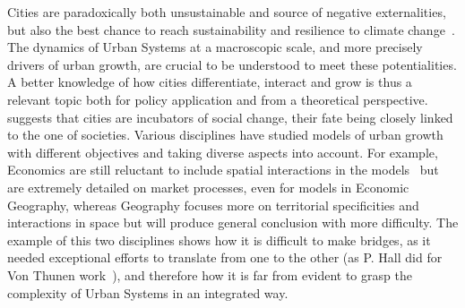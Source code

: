 Cities are paradoxically both unsustainable and source of negative externalities, but also the best chance to reach sustainability and resilience to climate change~\citep{glaeser2011triumph}. The dynamics of Urban Systems at a macroscopic scale, and more precisely drivers of urban growth, are crucial to be understood to meet these potentialities. A better knowledge of how cities differentiate, interact and grow is thus a relevant topic both for policy application and from a theoretical perspective. \cite{pumain2009innovation} suggests that cities are incubators of social change, their fate being closely linked to the one of societies. Various disciplines have studied models of urban growth with different objectives and taking diverse aspects into account. For example, Economics are still reluctant to include spatial interactions in the models~\citep{krugman1998space} but are extremely detailed on market processes, even for models in Economic Geography, whereas Geography focuses more on territorial specificities and interactions in space but will produce general conclusion with more difficulty. The example of this two disciplines shows how it is difficult to make bridges, as it needed exceptional efforts to translate from one to the other (as P. Hall did for Von Thunen work~\citep{taylor2016polymath}), and therefore how it is far from evident to grasp the complexity of Urban Systems in an integrated way.


